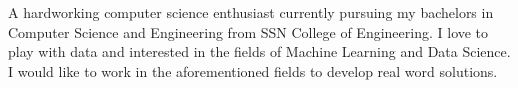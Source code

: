 %
%
%

\par{
A hardworking computer science enthusiast  currently pursuing my bachelors in Computer Science and Engineering from SSN College of Engineering. I love to play with data and
interested in the fields of Machine Learning and Data Science. I would like to work in the aforementioned fields to develop real word solutions.
}